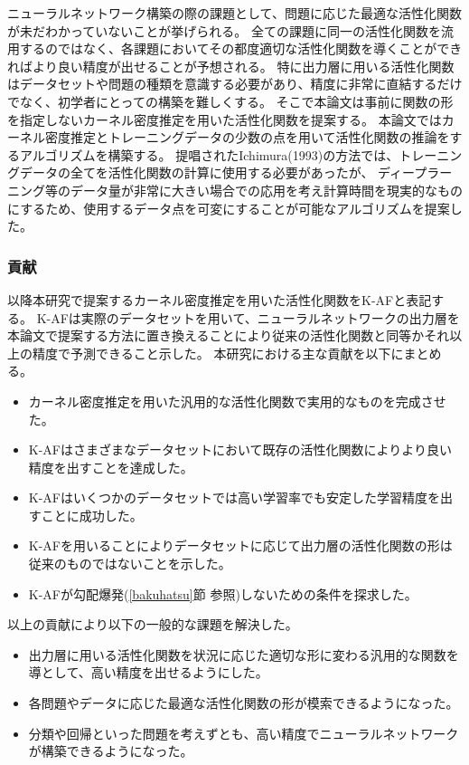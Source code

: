 ニューラルネットワーク構築の際の課題として、問題に応じた最適な活性化関数が未だわかっていないことが挙げられる。
全ての課題に同一の活性化関数を流用するのではなく、各課題においてその都度適切な活性化関数を導くことができればより良い精度が出せることが予想される。
特に出力層に用いる活性化関数はデータセットや問題の種類を意識する必要があり、精度に非常に直結するだけでなく、初学者にとっての構築を難しくする。
そこで本論文は事前に関数の形を指定しないカーネル密度推定を用いた活性化関数を提案する。
本論文ではカーネル密度推定とトレーニングデータの少数の点を用いて活性化関数の推論をするアルゴリズムを構築する。
提唱されたIchimura(1993)の方法では、トレーニングデータの全てを活性化関数の計算に使用する必要があったが、
ディープラーニング等のデータ量が非常に大きい場合での応用を考え計算時間を現実的なものにするため、使用するデータ点を可変にすることが可能なアルゴリズムを提案した。


\subsubsection{貢献}
\label{kouken}

以降本研究で提案するカーネル密度推定を用いた活性化関数をK-AFと表記する。
K-AFは実際のデータセットを用いて、ニューラルネットワークの出力層を本論文で提案する方法に置き換えることにより従来の活性化関数と同等かそれ以上の精度で予測できること示した。
本研究における主な貢献を以下にまとめる。

\begin{itemize}
  \item カーネル密度推定を用いた汎用的な活性化関数で実用的なものを完成させた。
  \item K-AFはさまざまなデータセットにおいて既存の活性化関数によりより良い精度を出すことを達成した。
  \item K-AFはいくつかのデータセットでは高い学習率でも安定した学習精度を出すことに成功した。
  \item K-AFを用いることによりデータセットに応じて出力層の活性化関数の形は従来のものではないことを示した。
  \item K-AFが勾配爆発(\ref{bakuhatsu}節 参照)しないための条件を探求した。
\end{itemize}

以上の貢献により以下の一般的な課題を解決した。

\begin{itemize}
  \item 出力層に用いる活性化関数を状況に応じた適切な形に変わる汎用的な関数を導として、高い精度を出せるようにした。
  \item 各問題やデータに応じた最適な活性化関数の形が模索できるようになった。
  \item 分類や回帰といった問題を考えずとも、高い精度でニューラルネットワークが構築できるようになった。
\end{itemize}



